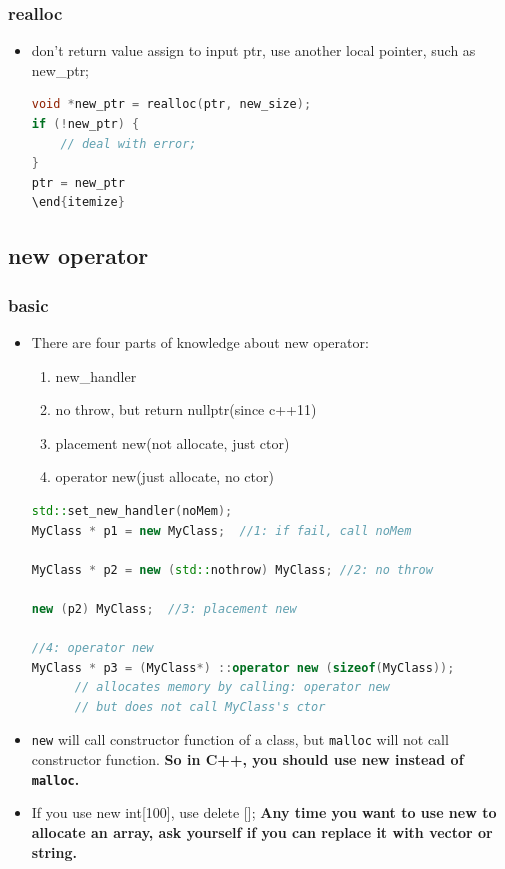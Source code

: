 \documentclass[a4paper,12pt,twoside]{book}
\begin{document}
\subsubsection{realloc}

\begin{itemize}
\item don't return value assign to input ptr, use another local pointer, such as new\_ptr;
 \begin{lstlisting}[frame=single, language=c++]
void *new_ptr = realloc(ptr, new_size);
if (!new_ptr) {
    // deal with error;
}
ptr = new_ptr
\end{itemize}
\end{lstlisting}
\end{itemize}

\subsection{new operator}
\subsubsection{basic}
\begin{itemize}

\item There are four parts of knowledge about new operator:
\begin{enumerate}
\item new\_handler
\item no throw, but return nullptr(since c++11)
\item placement new(not allocate, just ctor)
\item operator new(just allocate, no ctor)
\end{enumerate}

\begin{lstlisting}[frame=single, language=c++]
std::set_new_handler(noMem);
MyClass * p1 = new MyClass;  //1: if fail, call noMem

MyClass * p2 = new (std::nothrow) MyClass; //2: no throw

new (p2) MyClass;  //3: placement new

//4: operator new
MyClass * p3 = (MyClass*) ::operator new (sizeof(MyClass));
      // allocates memory by calling: operator new
      // but does not call MyClass's ctor
\end{lstlisting}

\item \texttt{new} will call constructor function of a class, but \texttt{malloc} will not call constructor function.  \textbf{So in C++, you should use new instead of \texttt{malloc}.}

\item If you use new int[100], use delete [];  \textbf{Any time you want to use new to allocate an array, ask yourself if you can replace it with vector or string.}

\end{itemize}
\end{document}
